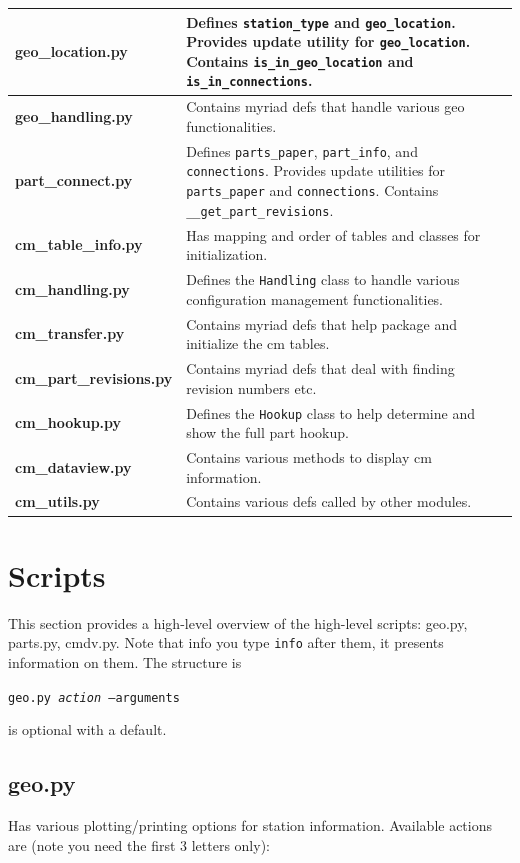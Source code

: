 \documentclass{article}[10pt]
\begin{document}
\begin{tabular}{l p{12cm}}
{\bf geo\_location.py} & Defines {\tt station\_type} and {\tt geo\_location}.  Provides update utility for {\tt geo\_location}.  Contains {\tt is\_in\_geo\_location} and {\tt is\_in\_connections}. \\ \hline
{\bf geo\_handling.py} & Contains myriad defs that handle various geo functionalities.\\ \hline
{\bf part\_connect.py} & Defines {\tt parts\_paper}, {\tt part\_info}, and {\tt connections}.  Provides update utilities for {\tt parts\_paper} and {\tt connections}. Contains {\tt \_\_get\_part\_revisions}. \\ \hline
{\bf cm\_table\_info.py} & Has mapping and order of tables and classes for initialization. \\ \hline
{\bf cm\_handling.py} & Defines the {\tt Handling} class to handle various configuration management functionalities.\\ \hline
{\bf cm\_transfer.py} & Contains myriad defs that help package and initialize the cm tables.\\ \hline
{\bf cm\_part\_revisions.py} & Contains myriad defs that deal with finding revision numbers etc.\\ \hline
{\bf cm\_hookup.py} & Defines the {\tt Hookup} class to help determine and show the full part hookup.\\ \hline
{\bf cm\_dataview.py} & Contains various methods to display cm information.\\ \hline
{\bf cm\_utils.py} & Contains various defs called by other modules.\\
\end{tabular}

\section{Scripts}
This section provides a high-level overview of the high-level scripts:  geo.py, parts.py, cmdv.py.  Note that info you type {\tt info} after them, it presents information on them.  The structure is

{\tt geo.py {\it action} --arguments}

 is optional with a default.

\subsection{geo.py}
Has various plotting/printing options for station information.  Available actions are (note you need the first 3 letters only):
\end{document}
